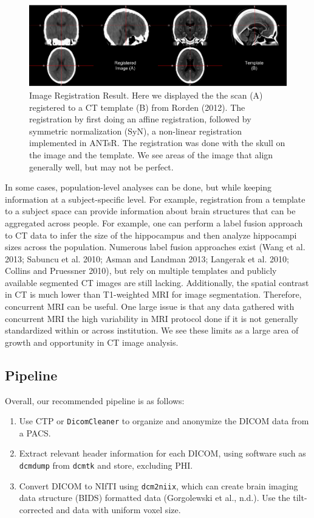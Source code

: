 \documentclass[]{elsarticle} %
\providecommand{\tightlist}{%
  \setlength{\itemsep}{0pt}\setlength{\parskip}{0pt}}
\begin{document}
\begin{figure}
\includegraphics[width=1\linewidth]{index_files/figure-latex/reg-1} \caption{Image Registration Result.  Here we displayed the the scan (A) registered to a CT template (B) from Rorden (2012).  The registration by first doing an affine registration, followed by symmetric normalization (SyN), a non-linear registration implemented in ANTsR. The registration was done with the skull on the image and the template.  We see areas of the image that align generally well, but may not be perfect.}\label{fig:reg}
\end{figure}

In some cases, population-level analyses can be done, but while keeping information at a subject-specific level. For example, registration from a template to a subject space can provide information about brain structures that can be aggregated across people. For example, one can perform a label fusion approach to CT data to infer the size of the hippocampus and then analyze hippocampi sizes across the population. Numerous label fusion approaches exist (Wang et al. 2013; Sabuncu et al. 2010; Asman and Landman 2013; Langerak et al. 2010; Collins and Pruessner 2010), but rely on multiple templates and publicly available segmented CT images are still lacking. Additionally, the spatial contrast in CT is much lower than T1-weighted MRI for image segmentation. Therefore, concurrent MRI can be useful. One large issue is that any data gathered with concurrent MRI the high variability in MRI protocol done if it is not generally standardized within or across institution. We see these limits as a large area of growth and opportunity in CT image analysis.

\hypertarget{pipeline}{%
\subsection{Pipeline}\label{pipeline}}

Overall, our recommended pipeline is as follows:

\begin{enumerate}
\def\labelenumi{\arabic{enumi}.}
\tightlist
\item
  Use CTP or \texttt{DicomCleaner} to organize and anonymize the DICOM data from a PACS.
\item
  Extract relevant header information for each DICOM, using software such as \texttt{dcmdump} from \texttt{dcmtk} and store, excluding PHI.
\item
  Convert DICOM to NIfTI using \texttt{dcm2niix}, which can create brain imaging data structure (BIDS) formatted data (Gorgolewski et al., n.d.). Use the tilt-corrected and data with uniform voxel size.
\end{enumerate}
\end{document}
